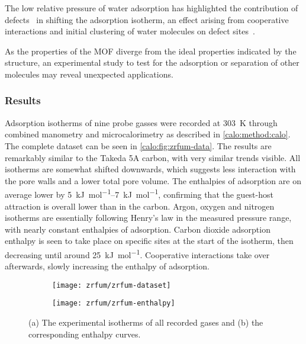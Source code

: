 The low relative pressure of water adsorption has highlighted
the contribution of defects~\cite{choiRoleStructuralDefects2018} in 
shifting the adsorption isotherm, an effect arising from cooperative
interactions and initial clustering of water molecules on defect
sites~\cite{vandichelWaterCoordinationDehydration2016}.

As the properties of the MOF diverge from the ideal properties
indicated by the structure, an experimental study to test for the adsorption
or separation of other molecules may reveal unexpected 
applications.

\subsubsection{Results}

Adsorption isotherms of nine probe gasses were recorded at 
\SI{303}{\kelvin} through combined manometry and microcalorimetry
as described in \autoref{calo:method:calo}. The complete 
dataset can be seen in \autoref{calo:fig:zrfum-data}.
The results are remarkably similar to the Takeda 5A carbon, with 
very similar trends visible. All isotherms are somewhat 
shifted downwards, which suggests less interaction with the 
pore walls and a lower total pore volume. The enthalpies of 
adsorption are on average lower by \SIrange{5}{7}{\kilo\joule\per\mol},
confirming that the guest-host attraction is overall lower than
in the carbon. Argon, oxygen and nitrogen isotherms are essentially
following Henry's law in the measured pressure range, with nearly constant
enthalpies of adsorption. Carbon dioxide adsorption enthalpy is seen to take
place on specific sites at the start of the isotherm, then
decreasing until around \SI{25}{{\kilo\joule\per\mol}}. Cooperative
interactions take over afterwards, slowly increasing the enthalpy 
of adsorption.

\begin{figure}[htb]
    \centering

	\begin{subfigure}[b]{.45\textwidth}
        \centering
        \texttt{[image: zrfum/zrfum-dataset]}
        \caption{}%
        \label{calo:fig:zrfum-dataset}
    \end{subfigure}%
	\quad
	\begin{subfigure}[b]{.45\textwidth}
        \centering
        \texttt{[image: zrfum/zrfum-enthalpy]}
        \caption{}%
        \label{calo:fig:zrfum-enthalpy}
    \end{subfigure}
    \caption{(a) The experimental isotherms of all recorded gases and
    (b) the corresponding enthalpy curves.}%
    \label{calo:fig:zrfum-data}

\end{figure}

